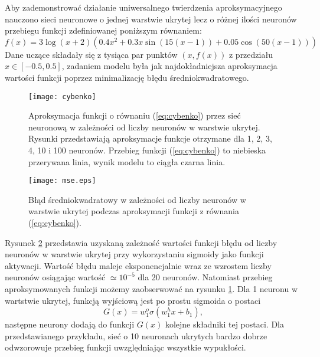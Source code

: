 \documentclass[11pt]{book}
\theoremstyle{definition}
\begin{document}
Aby zademonstrować działanie uniwersalnego twierdzenia aproksymacyjnego nauczono sieci neuronowe o jednej warstwie ukrytej lecz o różnej ilości neuronów przebiegu funkcji zdefiniowanej poniższym równaniem:
%
\begin{equation}
f(x) = 3\log\left(x+2\right) \left(0.4x^2+0.3x\sin(15(x-1))+0.05\cos\left(50(x-1)\right)\right) \label{eq:cybenko}
\end{equation}
%
Dane uczące składały się z tysiąca par punktów $(x,f(x))$ z przedziału $x\in [-0.5,0.5]$, zadaniem modelu była jak najdokładniejsza aproksymacja wartości funkcji poprzez minimalizację błędu średniokwadratowego. 
%
\begin{figure}[h!]
	\centering
	\texttt{[image: cybenko]}
	\caption{Aproksymacja funkcji o równaniu (\ref{eq:cybenko}) przez sieć neuronową w zależności od liczby neuronów w warstwie ukrytej. Rysunki przedstawiają aproksymacje funkcje otrzymane dla 1, 2, 3, 4, 10 i 100 neuronów. Przebieg funkcji (\ref{eq:cybenko}) to niebieska przerywana linia, wynik modelu to ciągła czarna linia.}
	\label{fig:cybenko2}
\end{figure}
%
\begin{figure}[h!]
	\centering
	\texttt{[image: mse.eps]}
	\caption{Błąd średniokwadratowy w zależności od liczby neuronów w warstwie ukrytej podczas aproksymacji funkcji z równania (\ref{eq:cybenko}).}
	\label{fig:cybenko1}
\end{figure}
Rysunek \ref{fig:cybenko1} przedstawia uzyskaną zależność wartości funkcji błędu od liczby neuronów w warstwie ukrytej przy wykorzystaniu sigmoidy jako funkcji aktywacji. Wartość błędu maleje eksponencjalnie wraz ze wzrostem liczby neuronów osiągając wartość $\simeq 10^{-5}$ dla 20 neuronów.
%
Natomiast przebieg aproksymowanych funkcji możemy zaobserwować na rysunku \ref{fig:cybenko2}. Dla 1 neuronu w wartstwie ukrytej, funkcją wyjściową jest po prostu sigmoida o postaci $$G\left(x\right) = w^o_1 \sigma\left(w^h_1x + b_1\right),$$ następne neurony dodają do funkcji $G(x)$ kolejne składniki tej postaci. Dla przedstawianego przykładu, sieć o 10 neuronach ukrytych bardzo dobrze odwzorowuje przebieg funkcji uwzględniając wszystkie wypukłości.
\end{document}
